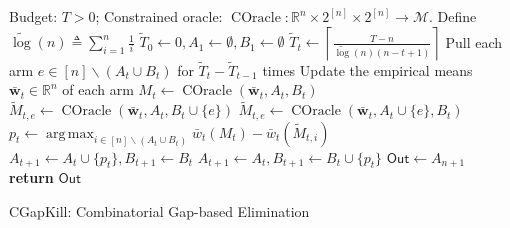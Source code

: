 \documentclass{article}
\newcommand{\AlgorithmBud}{{\small \textsf{CGapKill}}\xspace}
\newcommand{\M}{\mathcal M}
\newcommand{\del}{\backslash}
\newcommand{\RR}{\mathbb R}
\DeclareMathOperator*{\argmax}{arg\,max}
\DeclareMathOperator{\COracle}{COracle}
\newcommand{\out}{\mathsf{Out}}
\newcommand{\barlog}{\tilde{\log}}
\renewcommand{\vec}[1]{\boldsymbol{#1}}
\begin{document}
\begin{algorithm}[htbp]
{
\small
\begin{algorithmic}[1]
\Require Budget: $T>0$; Constrained oracle: $\COracle: \RR^n\times 2^{[n]} \times 2^{[n]} \rightarrow \M$.
\State Define $\barlog(n) \triangleq \sum_{i=1}^n \frac1i$
\State $\tilde T_0 \gets 0, A_1 \gets \emptyset, B_1\gets \emptyset$
	\State $\tilde T_t \gets \left\lceil \frac{T-n}{\barlog(n)(n-t+1)} \right\rceil$
	\State Pull each arm $e\in [n]\del (A_t\cup B_t)$ for $\tilde T_t - \tilde T_{t-1}$ times
	\State Update the empirical means $\vec {\bar w}_t\in \RR^n$ of each arm
	\State $M_t \gets \COracle(\vec {\bar w}_t, A_t, B_t)$
	\For{\textbf{each} $e \in [n]\del (A_t\cup B_t)$}
			\State $\tilde M_{t,e} \gets \COracle(\vec {\bar w}_t, A_t, B_t \cup \{e\})$
	  \Else
	    \State $\tilde M_{t,e} \gets \COracle(\vec {\bar w}_t, A_t \cup \{e\}, B_t)$
	  \EndIf
	\EndFor
	\State $p_t \gets \argmax_{i\in[n]\del (A_t\cup B_t)} \bar w_t(M_t) - \bar w_t(\tilde M_{t,i})$
		\State $A_{t+1} \gets A_t \cup \{p_t\}, B_{t+1} \gets B_t$
	\Else
		\State $A_{t+1} \gets A_t , B_{t+1} \gets B_t \cup \{p_t\}$
	\EndIf
\EndFor
\State $\out\gets A_{n+1}$
\State \textbf{return} $\out$
\end{algorithmic}
\caption{\AlgorithmBud: Combinatorial Gap-based Elimination}
\label{algo:budget}
}
\end{algorithm}
\end{document}
